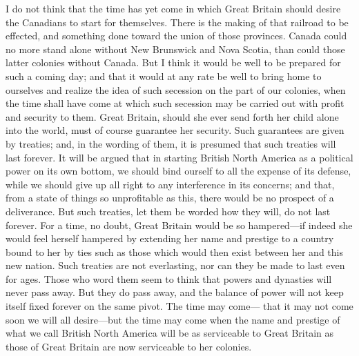 I do not think that the time has yet come in which Great Britain
should desire the Canadians to start for themselves.  There is the
making of that railroad to be effected, and something done toward
the union of those provinces.  Canada could no more stand alone
without New Brunswick and Nova Scotia, than could those latter
colonies without Canada.  But I think it would be well to be
prepared for such a coming day; and that it would at any rate be
well to bring home to ourselves and realize the idea of such
secession on the part of our colonies, when the time shall have
come at which such secession may be carried out with profit and
security to them.  Great Britain, should she ever send forth her
child alone into the world, must of course guarantee her security.
Such guarantees are given by treaties; and, in the wording of them,
it is presumed that such treaties will last forever.  It will be
argued that in starting British North America as a political power
on its own bottom, we should bind ourself to all the expense of its
defense, while we should give up all right to any interference in
its concerns; and that, from a state of things so unprofitable as
this, there would be no prospect of a deliverance.  But such
treaties, let them be worded how they will, do not last forever.
For a time, no doubt, Great Britain would be so hampered---if indeed
she would feel herself hampered by extending her name and prestige
to a country bound to her by ties such as those which would then
exist between her and this new nation.  Such treaties are not
everlasting, nor can they be made to last even for ages.  Those who
word them seem to think that powers and dynasties will never pass
away.  But they do pass away, and the balance of power will not
keep itself fixed forever on the same pivot.  The time may come---%
that it may not come soon we will all desire---but the time may come
when the name and prestige of what we call British North America
will be as serviceable to Great Britain as those of Great Britain
are now serviceable to her colonies.

